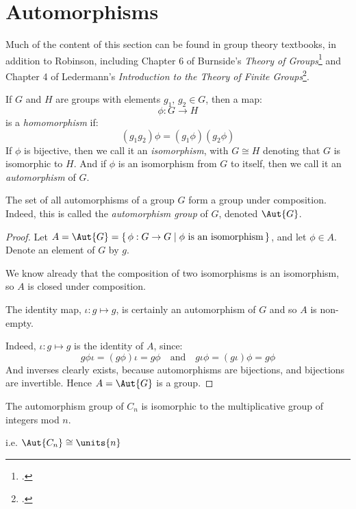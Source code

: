 \section{Automorphisms}
Much of the content of this section can be found in group theory textbooks, in addition to Robinson, including Chapter 6 of Burnside's \textit{Theory of
Groups}\footcite[Ch. 6]{burnside1911} and Chapter 4 of Ledermann's \textit{Introduction to the Theory of Finite
Groups}\footcite[Ch. 4]{ledermann1961}.
\begin{definition}
    \raggedright
    If \(G\) and \(H\) are groups with elements \(g_1,\, g_2 \in G\), then a map:
    \[\phi:G \to H\]
    is a \emph{homomorphism} if:
    \[(g_1 g_2)\phi = (g_1\phi)(g_2\phi)\]
    If \(\phi\) is bijective, then we call it an \emph{isomorphism}, with \(G \cong H\) denoting that \(G\) is
    isomorphic to \(H\).
    And if \(\phi\) is an isomorphism from \(G\) to itself, then we call it an \emph{automorphism} of
    \(G\).
\end{definition}

\begin{lemma}
    \raggedright
    The set of all automorphisms of a group \(G\) form a group under composition.
    Indeed, this is called the \emph{automorphism group} of \(G\), denoted \(\Aut{G}\).
\end{lemma}

\begin{proof}
    Let \(A = \Aut{G} = \{\,\phi:G \to G \mid \phi\ \text{is an isomorphism}\,\}\), and let \(\phi \in A\).
    Denote an element of \(G\) by \(g\).

    We know already that the composition of two isomorphisms is an isomorphism, so \(A\) is closed under composition.

    The identity map, \(\iota:g \mapsto g\), is certainly an automorphism of \(G\) and so \(A\) is non-empty.

    Indeed, \(\iota:g \mapsto g\) is the identity of \(A\), since:
    \[g\phi\iota = (g\phi)\iota = g\phi \quad \text{and} \quad g\iota\phi = (g\iota)\phi = g\phi\]
    And inverses clearly exists, because automorphisms are bijections, and bijections are invertible.
    Hence \(A = \Aut{G}\) is a group.
\end{proof}

\begin{lemma}\label{lem:aut}
    \raggedright
    The automorphism group of \(C_n\) is isomorphic to the multiplicative group
    of integers mod \(n\).

    i.e. \(\Aut{C_n} \cong \units{n}\)
\end{lemma}

